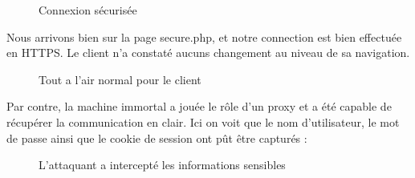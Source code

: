 \begin{figure}[H]
  \caption{Connexion sécurisée}
\end{figure}

Nous arrivons bien sur la page secure.php, et notre connection est bien effectuée en HTTPS. Le client n'a constaté aucuns changement au niveau de sa navigation.

\begin{figure}[H]
  \caption{Tout a l'air normal pour le client}
\end{figure}

Par contre, la machine immortal a jouée le rôle d'un proxy et a été capable de récupérer la communication en clair. Ici on voit que le nom d'utilisateur, le mot de passe ainsi que le cookie de session ont pût être capturés :

\begin{figure}[H]
  \caption{L'attaquant a intercepté les informations sensibles}
\end{figure}
